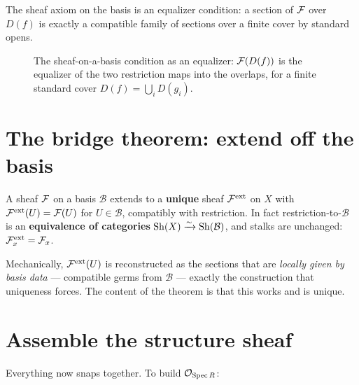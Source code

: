 The sheaf axiom on the basis is an equalizer condition: a section of $\mathcal{F}$ over $D(f)$ is exactly a
compatible family of sections over a finite cover by standard opens.

\begin{figure}[h]
\centering
{}
\caption{The sheaf-on-a-basis condition as an equalizer: $\mathcal{F}(D(f))$ is the equalizer of the two
restriction maps into the overlaps, for a finite standard cover $D(f)=\bigcup_i D(g_i)$.}
\end{figure}

\section{The bridge theorem: extend off the basis}

\begin{defbox}
A sheaf $\mathcal{F}$ on a basis $\mathcal B$ extends to a \textbf{unique} sheaf $\mathcal{F}^{\mathrm{ext}}$ on $X$
with $\mathcal{F}^{\mathrm{ext}}(U)=\mathcal{F}(U)$ for $U\in\mathcal B$, compatibly with restriction. In fact
restriction-to-$\mathcal B$ is an \textbf{equivalence of categories}
$\operatorname{Sh}(X)\xrightarrow{\sim}\operatorname{Sh}(\mathcal B)$, and stalks are unchanged:
$\mathcal{F}^{\mathrm{ext}}_x=\mathcal{F}_x$.
\end{defbox}

Mechanically, $\mathcal{F}^{\mathrm{ext}}(U)$ is reconstructed as the sections that are \emph{locally given by
basis data} --- compatible germs from $\mathcal B$ --- exactly the construction that uniqueness forces.
The content of the theorem is that this works and is unique.

\section{Assemble the structure sheaf}

Everything now snaps together. To build $\mathcal{O}_{\operatorname{Spec} R}$:

